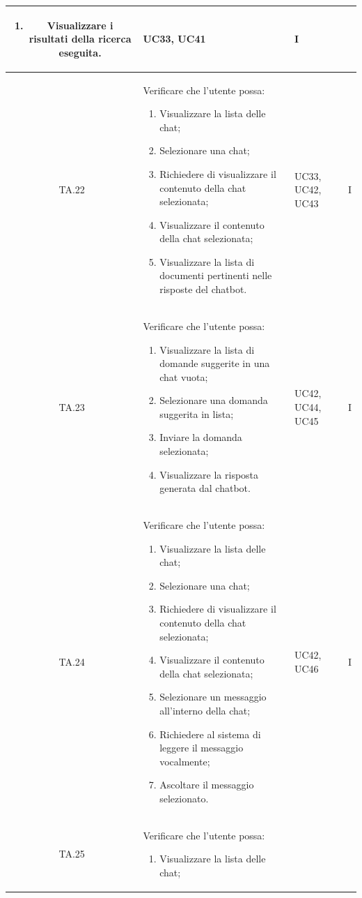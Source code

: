 \documentclass[10pt, a4paper]{article}
\begin{document}
\begin{xltabular}{\textwidth}{|c|X|p{2.5cm}|c|}
\begin{enumerate}
    \item Visualizzare i risultati della ricerca eseguita.
\end{enumerate}
& UC33, UC41 & I \\
\hline
TA.22 & Verificare che l'utente possa:
\begin{enumerate}
    \item Visualizzare la lista delle chat;
    \item Selezionare una chat;
    \item Richiedere di visualizzare il contenuto della chat selezionata;
    \item Visualizzare il contenuto della chat selezionata;
    \item Visualizzare la lista di documenti pertinenti nelle risposte del chatbot.
\end{enumerate}
& UC33, UC42, UC43 & I \\
\hline
TA.23 & Verificare che l'utente possa:
\begin{enumerate}
    \item Visualizzare la lista di domande suggerite in una chat vuota;
    \item Selezionare una domanda suggerita in lista;
    \item Inviare la domanda selezionata;
    \item Visualizzare la risposta generata dal chatbot.
\end{enumerate}
& UC42, UC44, UC45 & I \\
\hline
TA.24 & Verificare che l'utente possa:
\begin{enumerate}
    \item Visualizzare la lista delle chat;
    \item Selezionare una chat;
    \item Richiedere di visualizzare il contenuto della chat selezionata;
    \item Visualizzare il contenuto della chat selezionata;
    \item Selezionare un messaggio all'interno della chat;
    \item Richiedere al sistema di leggere il messaggio vocalmente;
    \item Ascoltare il messaggio selezionato.
\end{enumerate}
& UC42, UC46 & I \\
\hline
TA.25 & Verificare che l'utente possa:
\begin{enumerate}
    \item Visualizzare la lista delle chat;

\end{enumerate}
\end{xltabular}
\end{document}
